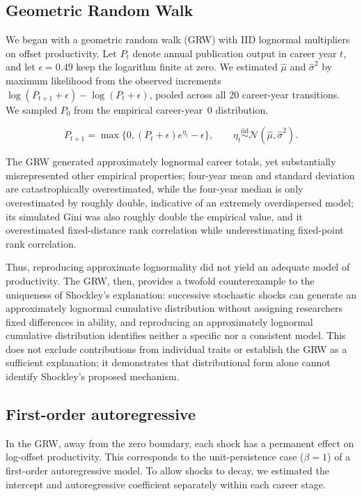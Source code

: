 \documentclass{article}
\begin{document}
\subsection*{Geometric Random Walk}\label{subsec:model_GRW}
We began with a geometric random walk (GRW) with IID lognormal multipliers on offset productivity. Let $P_t$ denote annual publication output in career year $t$, and let $\epsilon=0.49$ keep the logarithm finite at zero. We estimated $\hat\mu$ and $\hat\sigma^2$ by maximum likelihood from the observed increments $\log(P_{t+1}+\epsilon)-\log(P_t+\epsilon)$, pooled across all 20 career-year transitions. We sampled $P_0$ from the empirical career-year~0 distribution.

\begin{equation}
P_{t+1}=\max\{0,(P_t+\epsilon)e^{\eta_t}-\epsilon\},\qquad
\eta_t\overset{\mathrm{iid}}{\sim}
\mathcal{N}(\hat\mu,\hat\sigma^2).
\label{eq:grw}
\end{equation}

The GRW generated approximately lognormal career totals, yet substantially misrepresented other empirical properties; four-year mean and standard deviation are catastrophically overestimated, while the four-year median is only overestimated by roughly double, indicative of an extremely overdispersed model; its simulated Gini was also roughly double the empirical value, and it overestimated fixed-distance rank correlation while underestimating fixed-point rank correlation.

Thus, reproducing approximate lognormality did not yield an adequate model of productivity. The GRW, then, provides a twofold counterexample to the uniqueness of Shockley's explanation: successive stochastic shocks can generate an approximately lognormal cumulative distribution without assigning researchers fixed differences in ability, and reproducing an approximately lognormal cumulative distribution identifies neither a specific nor a consistent model. This does not exclude contributions from individual traits or establish the GRW as a sufficient explanation; it demonstrates that distributional form alone cannot identify Shockley's proposed mechanism.

\subsection*{First-order autoregressive}\label{subsec_model_AR1}
In the GRW, away from the zero boundary, each shock has a permanent
effect on log-offset productivity. This corresponds to the
unit-persistence case ($\beta=1$) of a first-order autoregressive
model. To allow shocks to decay, we estimated the intercept and
autoregressive coefficient separately within each career stage.
\end{document}
